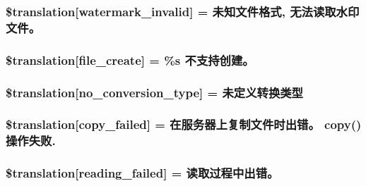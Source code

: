 \subsubsection[{\$translation}]{\setlength{\rightskip}{0pt plus 5cm}\$translation\mbox{[}\textquotesingle{}watermark\+\_\+invalid\textquotesingle{}\mbox{]} = \textquotesingle{}未知文件格式, 无法读取水印文件。\textquotesingle{}}\label{class_8upload_8zh___c_n_8php_ac336e7a5701e47ba4a05e9e498a3cc44}
\hypertarget{class_8upload_8zh___c_n_8php_a1ecb4673e4fb69e06b3f20b65cecf30a}{}
\subsubsection[{\$translation}]{\setlength{\rightskip}{0pt plus 5cm}\$translation\mbox{[}\textquotesingle{}file\+\_\+create\textquotesingle{}\mbox{]} = \textquotesingle{}\%s 不支持创建。\textquotesingle{}}\label{class_8upload_8zh___c_n_8php_a1ecb4673e4fb69e06b3f20b65cecf30a}
\hypertarget{class_8upload_8zh___c_n_8php_a4712d7ec28e9a7f17eb3338af2358363}{}
\subsubsection[{\$translation}]{\setlength{\rightskip}{0pt plus 5cm}\$translation\mbox{[}\textquotesingle{}no\+\_\+conversion\+\_\+type\textquotesingle{}\mbox{]} = \textquotesingle{}未定义转换类型\textquotesingle{}}\label{class_8upload_8zh___c_n_8php_a4712d7ec28e9a7f17eb3338af2358363}
\hypertarget{class_8upload_8zh___c_n_8php_a783c9358bcf54a054545b50098bc679b}{}
\subsubsection[{\$translation}]{\setlength{\rightskip}{0pt plus 5cm}\$translation\mbox{[}\textquotesingle{}copy\+\_\+failed\textquotesingle{}\mbox{]} = \textquotesingle{}在服务器上复制文件时出错。 copy() 操作失败.\textquotesingle{}}\label{class_8upload_8zh___c_n_8php_a783c9358bcf54a054545b50098bc679b}
\hypertarget{class_8upload_8zh___c_n_8php_a01bea14c9fd5f353f62db44beabfcd42}{}
\subsubsection[{\$translation}]{\setlength{\rightskip}{0pt plus 5cm}\$translation\mbox{[}\textquotesingle{}reading\+\_\+failed\textquotesingle{}\mbox{]} = \textquotesingle{}读取过程中出错。\textquotesingle{}}\label{class_8upload_8zh___c_n_8php_a01bea14c9fd5f353f62db44beabfcd42}
